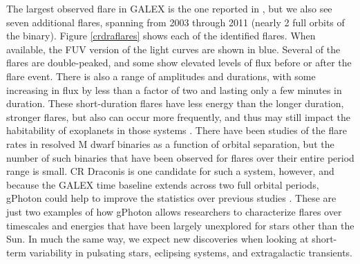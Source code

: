 \documentclass[preprint]{aastex}
\begin{document}
The largest observed flare in GALEX is the one reported in \citet{wel2006}, but we also see seven additional flares, spanning from 2003 through 2011 (nearly 2 full orbits of the binary). Figure \ref{crdraflares} shows each of the identified flares. When available, the FUV version of the light curves are shown in blue.  Several of the flares are double-peaked, and some show elevated levels of flux before or after the flare event.  There is also a range of amplitudes and durations, with some increasing in flux by less than a factor of two and lasting only a few minutes in duration. These short-duration flares have less energy than the longer duration, stronger flares, but also can occur more frequently, and thus may still impact the habitability of exoplanets in those systems \citep[e.g.,][]{ram2013}. There have been studies of the flare rates in resolved M dwarf binaries as a function of orbital separation, but the number of such binaries that have been observed for flares over their entire period range is small. CR Draconis is one candidate for such a system, however, and because the GALEX time baseline extends across two full orbital periods, gPhoton could help to improve the statistics over previous studies \citep{tam2008}. These are just two examples of how gPhoton allows researchers to characterize flares over timescales and energies that have been largely unexplored for stars other than the Sun.  In much the same way, we expect new discoveries when looking at short-term variability in pulsating stars, eclipsing systems, and extragalactic transients.
\end{document}
